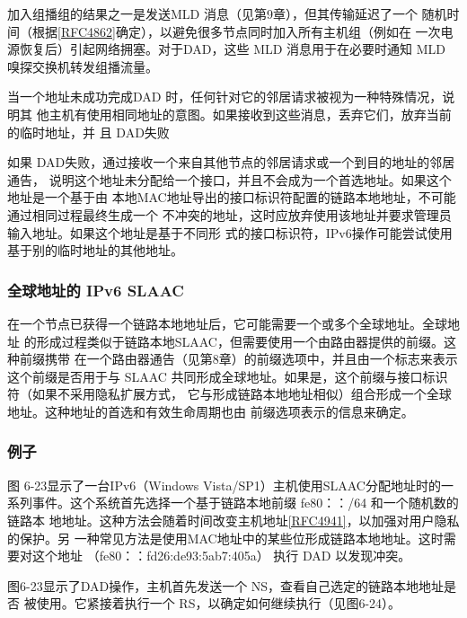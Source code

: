 \begin{tcolorbox}
    加入组播组的结果之一是发送MLD 消息（见第9章），但其传输延迟了一个
    随机时间（根据\href{https://www.rfc-editor.org/rfc/rfc4862}{\href{https://www.rfc-editor.org/rfc/rfc4862}{[RFC4862]}}确定），以避免很多节点同时加入所有主机组（例如在
    一次电源恢复后）引起网络拥塞。对于DAD，这些 MLD 消息用于在必要时通知
    MLD 嗅探交换机转发组播流量。
\end{tcolorbox}

当一个地址未成功完成DAD 时，任何针对它的邻居请求被视为一种特殊情况，说明其
他主机有使用相同地址的意图。如果接收到这些消息，丢弃它们，放弃当前的临时地址，并
且 DAD失败

如果 DAD失败，通过接收一个来自其他节点的邻居请求或一个到目的地址的邻居通告，
说明这个地址未分配给一个接口，并且不会成为一个首选地址。如果这个地址是一个基于由
本地MAC地址导出的接口标识符配置的链路本地地址，不可能通过相同过程最终生成一个
不冲突的地址，这时应放弃使用该地址并要求管理员输入地址。如果这个地址是基于不同形
式的接口标识符，IPv6操作可能尝试使用基于别的临时地址的其他地址。

\subsubsection{全球地址的 IPv6 SLAAC}
在一个节点已获得一个链路本地地址后，它可能需要一个或多个全球地址。全球地址
的形成过程类似于链路本地SLAAC，但需要使用一个由路由器提供的前缀。这种前缀携带
在一个路由器通告（见第8章）的前缀选项中，并且由一个标志来表示这个前缀是否用于与
SLAAC 共同形成全球地址。如果是，这个前缀与接口标识符（如果不采用隐私扩展方式，
它与形成链路本地地址相似）组合形成一个全球地址。这种地址的首选和有效生命周期也由
前缀选项表示的信息来确定。

\subsubsection{例子}
图 6-23显示了一台IPv6（Windows Vista/SP1）主机使用SLAAC分配地址时的一
系列事件。这个系统首先选择一个基于链路本地前缀 fe80：：/64 和一个随机数的链路本
地地址。这种方法会随着时间改变主机地址\href{https://www.rfc-editor.org/rfc/rfc4941}{\href{https://www.rfc-editor.org/rfc/rfc4941}{[RFC4941]}}，以加强对用户隐私的保护。另
一种常见方法是使用MAC地址中的某些位形成链路本地地址。这时需要对这个地址
（fe80：：fd26:de93:5ab7:405a） 执行 DAD 以发现冲突。

图6-23显示了DAD操作，主机首先发送一个 NS，查看自己选定的链路本地地址是否
被使用。它紧接着执行一个 RS，以确定如何继续执行（见图6-24）。

